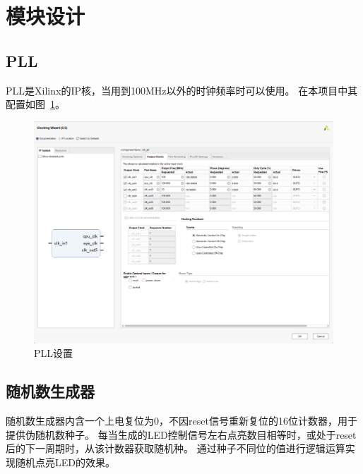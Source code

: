 \section{模块设计} \label{section: module design}
\subsection{PLL}
PLL是Xilinx的IP核，当用到100MHz以外的时钟频率时可以使用。
在本项目中其配置如图~\ref{fig: pll}。
\begin{figure}[htbp]
    \centering
    \includegraphics[width=0.7\linewidth]{Figures/1. MyFigs/pll_settings}
    \caption{PLL设置}
    \label{fig: pll}
\end{figure}

\subsection{随机数生成器}
随机数生成器内含一个上电复位为0，不因reset信号重新复位的16位计数器，用于提供伪随机数种子。
每当生成的LED控制信号左右点亮数目相等时，或处于reset后的下一周期时，从该计数器获取随机种。
通过种子不同位的值进行逻辑运算实现随机点亮LED的效果。

